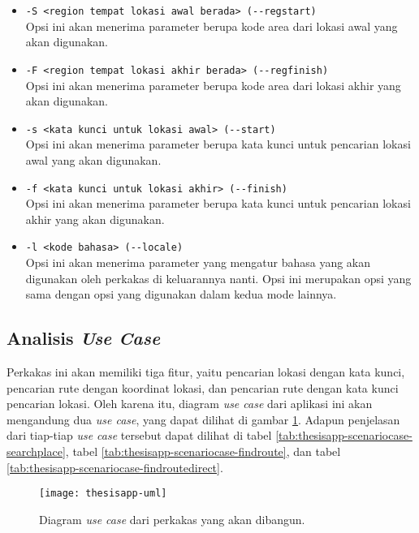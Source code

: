 \begin{itemize}
\begin{itemize}
		\begin{itemize}
			\item \verb|-S <region tempat lokasi awal berada> (--regstart)|\\
			Opsi ini akan menerima parameter berupa kode area dari lokasi awal yang akan digunakan.
			\item \verb|-F <region tempat lokasi akhir berada> (--regfinish)|\\
			Opsi ini akan menerima parameter berupa kode area dari lokasi akhir yang akan digunakan.
			\item \verb|-s <kata kunci untuk lokasi awal> (--start)|\\
			Opsi ini akan menerima parameter berupa kata kunci untuk pencarian lokasi awal yang akan digunakan.
			\item \verb|-f <kata kunci untuk lokasi akhir> (--finish)|\\
			Opsi ini akan menerima parameter berupa kata kunci untuk pencarian lokasi akhir yang akan digunakan.
			\item \verb|-l <kode bahasa> (--locale)|\\
			Opsi ini akan menerima parameter yang mengatur bahasa yang akan digunakan oleh perkakas di keluarannya nanti. Opsi ini merupakan opsi yang sama dengan opsi yang digunakan dalam kedua mode lainnya.
		\end{itemize}
		
	\end{itemize}
	
\end{itemize}

\subsection{Analisis \textit{Use Case}}
\label{sec:analysis-thesisapp-usecases}

Perkakas \cl ini akan memiliki tiga fitur, yaitu pencarian lokasi dengan kata kunci, pencarian rute dengan koordinat \latlon lokasi, dan pencarian rute dengan kata kunci pencarian lokasi. Oleh karena itu, diagram \textit{use case} dari aplikasi ini akan mengandung dua \textit{use case}, yang dapat dilihat di gambar \ref{fig:thesisapp-uml}. Adapun penjelasan dari tiap-tiap \textit{use case} tersebut dapat dilihat di tabel \ref{tab:thesisapp-scenariocase-searchplace}, tabel \ref{tab:thesisapp-scenariocase-findroute}, dan tabel \ref{tab:thesisapp-scenariocase-findroutedirect}.

\begin{figure}[ht]
    \centering
    \texttt{[image: thesisapp-uml]}
    \caption[Diagram \textit{use case} perkakas yang akan dibangun]{Diagram \textit{use case} dari perkakas yang akan dibangun.}
    \label{fig:thesisapp-uml}
\end{figure}

